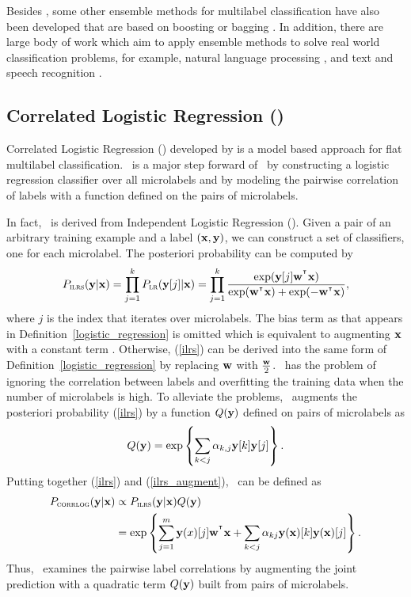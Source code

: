 {Besides \adaboostmh, some other ensemble methods for multilabel classification have also been developed that are based on boosting or bagging \citep{Wang07simple,Yan07model,Kocev13tree}.
In addition, there are large body of work which aim to apply ensemble methods to solve real world classification problems, for example, natural language processing \citep{Collins05distrimnative,Zeman05improving,Sagae06parsing,Zhang09kbest}, and text and speech recognition \citep{Fiscus97a,Benesty08speech,Petrov10products}.


%
%
\subsection{Correlated Logistic Regression (\corrlog)} \label{sc_corrlog}

Correlated Logistic Regression (\corrlog) developed by \citet{Bian12corrlog} is a model based approach for flat multilabel classification.
\corrlog\ is a major step forward of \iblr\ by constructing a logistic regression classifier over all microlabels and by modeling the pairwise correlation of labels with a function defined on the pairs of microlabels.

In fact, \corrlog\ is derived from Independent Logistic Regression (\ilrs). 
Given a pair of an arbitrary training example and a label $(\mathbf {x},\mathbf {y})$, we can construct a set of \ilrs classifiers, one for each microlabel.
The posteriori probability can be computed by
\begin{align}
	P_{\text{{\sc ilrs}}}(\mathbf {y}|\mathbf {x}) 
	= \prod_{j=1}^{k}P_{\text{{\sc lr}}}(\mathbf {y}[j]|\mathbf {x})
	= \prod_{j=1}^{k}\frac{\exp(\mathbf {y}[j]\mathbf {w}^{^{\intercal}}\mathbf {x})}{\exp(\mathbf {w}^{^{\intercal}}\mathbf {x})+\exp(-\mathbf {w}^{^{\intercal}}\mathbf {x})}, \label{ilrs}
\end{align}
where $j$ is the index that iterates over microlabels. 
The bias term as that appears in Definition~\ref{logistic_regression} is omitted which is equivalent to augmenting $\mathbf {x}$ with a constant term \citep{Bian12corrlog}.
Otherwise, (\ref{ilrs}) can be derived into the same form of Definition~\ref{logistic_regression} by replacing $\mathbf {w}$ with $\frac{\mathbf {w}}{2}$.
\ilrs\ has the problem of ignoring the correlation between labels and overfitting the training data when the number of microlabels is high.
To alleviate the problems, \corrlog\ augments the posteriori probability (\ref{ilrs}) by a function $Q(\mathbf {y})$ defined on pairs of microlabels as
\begin{align}
	Q(\mathbf {y}) = \exp\left\{\sum_{k<j}\alpha_{k,j}\mathbf {y}[k]\mathbf {y}[j]\right\}. \label{ilrs_augment}
\end{align}
Putting together (\ref{ilrs}) and (\ref{ilrs_augment}), \corrlog\ can be defined as
\begin{align*}
	P_{\text{{\sc corrlog}}}(\mathbf {y}|\mathbf {x}) &\propto P_{\text{{\sc ilrs}}}(\mathbf {y}|\mathbf {x}) Q(\mathbf {y}) \\
		&=\exp\left\{ \sum_{j=1}^{m}\mathbf {y}(x)[j]\mathbf {w}^{^{\intercal}}\mathbf {x} + \sum_{k<j}\alpha_{kj}\mathbf {y}(\mathbf {x})[k]\mathbf {y}(\mathbf {x})[j] \right\}.
\end{align*}
Thus, \corrlog\ examines the pairwise label correlations by augmenting the joint prediction with a quadratic term $Q(\mathbf {y})$ built from pairs of microlabels.



}
